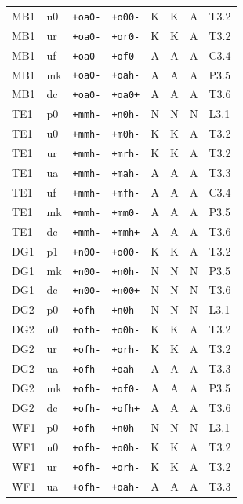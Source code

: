 {\begin{longtable}{@{}llllcccl@{}}
MB1 & u0 & \texttt{+oa0-} & \texttt{+o00-} & K & K & A & T3.2 \\
MB1 & ur & \texttt{+oa0-} & \texttt{+or0-} & K & K & A & T3.2 \\
MB1 & uf & \texttt{+oa0-} & \texttt{+of0-} & A & A & A & C3.4 \\
MB1 & mk & \texttt{+oa0-} & \texttt{+oah-} & A & A & A & P3.5 \\
MB1 & dc & \texttt{+oa0-} & \texttt{+oa0+} & A & A & A & T3.6 \\
TE1 & p0 & \texttt{+mmh-} & \texttt{+n0h-} & N & N & N & L3.1 \\
TE1 & u0 & \texttt{+mmh-} & \texttt{+m0h-} & K & K & A & T3.2 \\
TE1 & ur & \texttt{+mmh-} & \texttt{+mrh-} & K & K & A & T3.2 \\
TE1 & ua & \texttt{+mmh-} & \texttt{+mah-} & A & A & A & T3.3 \\
TE1 & uf & \texttt{+mmh-} & \texttt{+mfh-} & A & A & A & C3.4 \\
TE1 & mk & \texttt{+mmh-} & \texttt{+mm0-} & A & A & A & P3.5 \\
TE1 & dc & \texttt{+mmh-} & \texttt{+mmh+} & A & A & A & T3.6 \\
DG1 & p1 & \texttt{+n00-} & \texttt{+o00-} & K & K & A & T3.2 \\
DG1 & mk & \texttt{+n00-} & \texttt{+n0h-} & N & N & N & P3.5 \\
DG1 & dc & \texttt{+n00-} & \texttt{+n00+} & N & N & N & T3.6 \\
DG2 & p0 & \texttt{+ofh-} & \texttt{+n0h-} & N & N & N & L3.1 \\
DG2 & u0 & \texttt{+ofh-} & \texttt{+o0h-} & K & K & A & T3.2 \\
DG2 & ur & \texttt{+ofh-} & \texttt{+orh-} & K & K & A & T3.2 \\
DG2 & ua & \texttt{+ofh-} & \texttt{+oah-} & A & A & A & T3.3 \\
DG2 & mk & \texttt{+ofh-} & \texttt{+of0-} & A & A & A & P3.5 \\
DG2 & dc & \texttt{+ofh-} & \texttt{+ofh+} & A & A & A & T3.6 \\
WF1 & p0 & \texttt{+ofh-} & \texttt{+n0h-} & N & N & N & L3.1 \\
WF1 & u0 & \texttt{+ofh-} & \texttt{+o0h-} & K & K & A & T3.2 \\
WF1 & ur & \texttt{+ofh-} & \texttt{+orh-} & K & K & A & T3.2 \\
WF1 & ua & \texttt{+ofh-} & \texttt{+oah-} & A & A & A & T3.3 \\

\end{longtable}}
